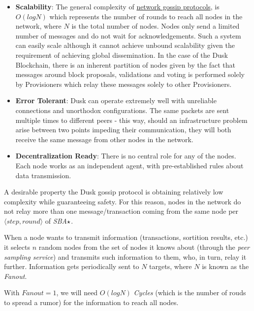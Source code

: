 \begin{itemize}
\item
  \textbf{Scalability}: The general complexity of
  \href{https://pdfs.semanticscholar.org/3df0/523ff58d8dec53e89a521831265af32f52d6.pdf}{network
  gossip protocols}, is
  \href{https://arxiv.org/pdf/1512.03022.pdf}{\(O(logN)\)} which
  represents the number of rounds to reach all nodes in the network,
  where \(N\) is the total number of nodes. Nodes only send a limited
  number of messages and do not wait for acknowledgements. Such a system
  can easily scale although it cannot achieve unbound scalability given
  the requirement of achieving global dissemination. In the case of
  the \textrm{Dusk} Blockchain, there is an inherent partition of nodes given by
  the fact that messages around block proposals, validations and voting
  is performed solely by Provisioners which relay these messages solely
  to other Provisioners.
\item
  \textbf{Error Tolerant}: \textrm{Dusk} can operate extremely well with
  unreliable connections and unorthodox configurations. The same packets
  are sent multiple times to different peers - this way, should an
  infrastructure problem arise between two points impeding their
  communication, they will both receive the same message from other
  nodes in the network.
\item
  \textbf{Decentralization Ready}: There is no central role for any of
  the nodes. Each node works as an independent agent, with
  pre-established rules about data transmission.
\end{itemize}



A desirable property the \textrm{Dusk} gossip protocol is obtaining relatively
low complexity while guaranteeing safety. For this reason, nodes
in the network do not relay more than one message/transaction coming
from the same node per \(\langle step, round \rangle\) of
\emph{SBA}\(\large\star\).

When a node wants to transmit information (transactions, sortition
results, etc.) it selects \(n\) random nodes from the set of nodes it
knows about (through the \emph{peer sampling service}) and transmits
such information to them, who, in turn, relay it further. Information
gets periodically sent to \(N\) targets, where \(N\) is known as the
\emph{Fanout}.

With \(Fanout=1\), we will need \(O(log N)\) \emph{Cycles} (which is the
number of rouds to spread a rumor) for the information to reach all
nodes.

